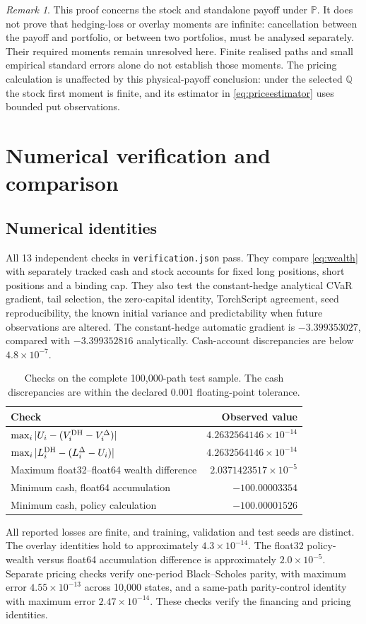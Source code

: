 \documentclass[11pt,a4paper]{article}
\newcommand{\Pp}{\mathbb P}
\newcommand{\Q}{\mathbb Q}
\theoremstyle{remark}
\newtheorem*{remark}{Remark}
\begin{document}
\begin{remark}
This proof concerns the stock and standalone payoff under $\Pp$. It does not prove that hedging-loss or overlay moments are infinite: cancellation between the payoff and portfolio, or between two portfolios, must be analysed separately. Their required moments remain unresolved here. Finite realised paths and small empirical standard errors alone do not establish those moments. The pricing calculation is unaffected by this physical-payoff conclusion: under the selected $\Q$ the stock first moment is finite, and its estimator in \eqref{eq:priceestimator} uses bounded put observations.
\end{remark}

\section{Numerical verification and comparison}
\subsection{Numerical identities}
All 13 independent checks in \texttt{verification.json} pass. They compare \eqref{eq:wealth} with separately tracked cash and stock accounts for fixed long positions, short positions and a binding cap. They also test the constant-hedge analytical CVaR gradient, tail selection, the zero-capital identity, TorchScript agreement, seed reproducibility, the known initial variance and predictability when future observations are altered. The constant-hedge automatic gradient is $-3.399353027$, compared with $-3.399352816$ analytically. Cash-account discrepancies are below $4.8\times10^{-7}$.
\begin{table}[htbp]
\centering\small
\caption{Checks on the complete 100,000-path test sample. The cash discrepancies are within the declared 0.001 floating-point tolerance.}
\label{tab:identitychecks}
\begin{tabular}{@{}lr@{}}
\toprule
Check & Observed value\\\midrule
$\max_i|U_i-(V_i^{\rm DH}-V_i^\Delta)|$ & $4.2632564146\times 10^{-14}$ \\
$\max_i|L_i^{\rm DH}-(L_i^\Delta-U_i)|$ & $4.2632564146\times 10^{-14}$ \\
Maximum float32--float64 wealth difference & $2.0371423517\times 10^{-5}$ \\
Minimum cash, float64 accumulation & $-100.00003354$ \\
Minimum cash, policy calculation & $-100.00001526$ \\
\bottomrule
\end{tabular}
\end{table}
All reported losses are finite, and training, validation and test seeds are distinct. The overlay identities hold to approximately $4.3\times10^{-14}$. The float32 policy-wealth versus float64 accumulation difference is approximately $2.0\times10^{-5}$. Separate pricing checks verify one-period Black--Scholes parity, with maximum error $4.55\times10^{-13}$ across 10,000 states, and a same-path parity-control identity with maximum error $2.47\times10^{-14}$. These checks verify the financing and pricing identities.
\end{document}
